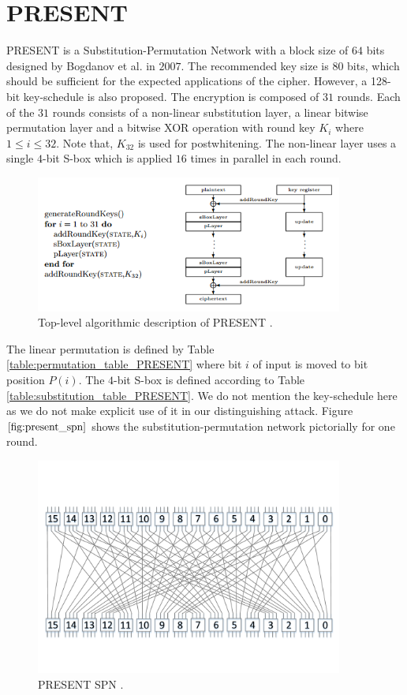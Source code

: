 \section{PRESENT} \label{section:present}
PRESENT is a Substitution-Permutation Network with a block size of $64$ bits designed by Bogdanov et al. \cite{bogdanov_PRESENT} in $2007$. The recommended key size is $80$ bits, which should be sufficient for the expected applications of the cipher. However, a 128-bit key-schedule is also proposed. The encryption is composed of $31$ rounds. Each of the $31$ rounds consists of a non-linear substitution layer, a linear bitwise permutation layer and a bitwise XOR operation with round key $K_i$ where $1 \leq i \leq 32$. Note that, $K_{32}$ is used for postwhitening. The non-linear layer uses a single $4$-bit S-box which is applied $16$ times in parallel in each round. 
\begin{figure}[h!]
    \centering
    \includegraphics[width=0.9\textwidth]{images/presentCipherAlgorithm}
    \caption{Top-level algorithmic description of PRESENT \cite{SSA_Collard_Standaert}.}
    \label{fig:PRESENT_block_diagram}
\end{figure}  The linear permutation is defined by Table  \ref{table:permutation_table_PRESENT} where bit $i$ of input is moved to bit position $P(i)$. The $4$-bit S-box is defined according to Table 
\ref{table:substitution_table_PRESENT}. We do not mention the key-schedule here as we do not make explicit use of it in our distinguishing attack. Figure $\ref{fig:present_spn}$ shows the substitution-permutation network pictorially for one round.\begin{figure}[h!]
    \centering
    \includegraphics[width=0.9\textwidth]{images/presentCipherSPNetwork}
    \caption{PRESENT SPN \cite{SSA_Collard_Standaert}.}
    \label{fig:present_spn}
\end{figure}
